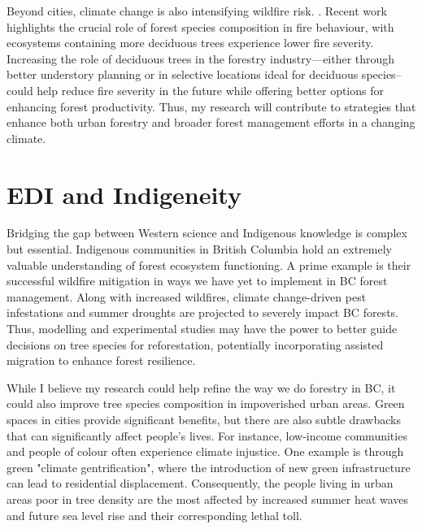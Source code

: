 \documentclass[11pt,letter]{article}
\begin{document}
Beyond cities, climate change is also intensifying wildfire risk. \citep{wasserman_climate_2023}. 
Recent work highlights the crucial role of forest species composition in fire behaviour, with ecosystems containing more deciduous trees experience lower fire severity. \citep{park_impact_2024}
Increasing the role of deciduous trees in the forestry industry---either through better understory planning or in selective locations ideal for deciduous species--could help reduce fire severity in the future while offering better options for enhancing forest productivity.\citep{mack_carbon_2021}  Thus, my research will contribute to strategies that enhance both urban forestry and broader forest management efforts in a changing climate.
\section *{EDI and Indigeneity}
Bridging the gap between Western science and Indigenous knowledge is complex but essential. Indigenous communities in British Columbia hold an extremely valuable understanding of forest ecosystem functioning. A prime example is their successful wildfire mitigation in ways we have yet to implement in BC forest management. Along with increased wildfires, climate change-driven pest infestations and summer droughts are projected to severely impact BC forests. \citep{williams_climate_2002} Thus, modelling and experimental studies may have the power to better guide decisions on tree species for reforestation, potentially incorporating assisted migration to enhance forest resilience. \citep{aitken_time_2016}

While I believe my research could help refine the way we do forestry in BC, it could also improve tree species composition in impoverished urban areas. Green spaces in cities provide significant benefits, but 
there are also subtle drawbacks that can significantly affect people's lives. For instance, low-income communities and people of colour often experience climate injustice. One example is through green "climate gentrification", where the introduction of new green infrastructure can lead to residential displacement. \citep{triffo_green_2022} Consequently, the people living in urban areas poor in tree density are the most affected by increased summer heat waves and future sea level rise and their corresponding lethal toll. \citep{triffo_green_2022} 
\end{document}
